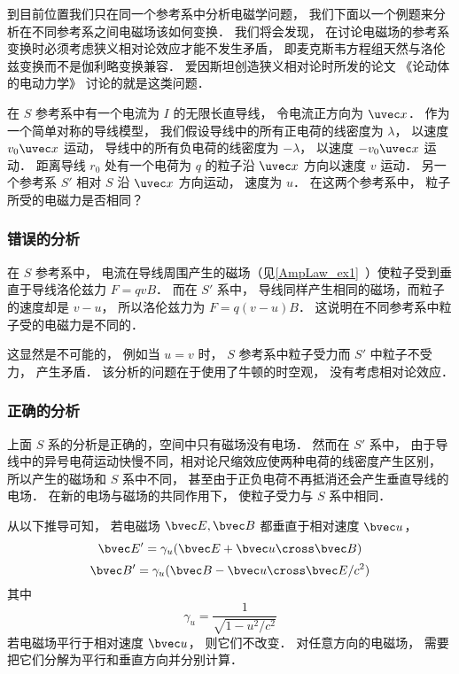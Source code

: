 
\begin{issues}
\issueDraft
\end{issues}


到目前位置我们只在同一个参考系中分析电磁学问题， 我们下面以一个例题来分析在不同参考系之间电磁场该如何变换． 我们将会发现， 在讨论电磁场的参考系变换时必须考虑狭义相对论效应才能不发生矛盾， 即麦克斯韦方程组天然与洛伦兹变换而不是伽利略变换兼容． 爱因斯坦创造狭义相对论时所发的论文 《论动体的电动力学》 讨论的就是这类问题．

在 $S$ 参考系中有一个电流为 $I$ 的无限长直导线， 令电流正方向为 $\uvec x$． 作为一个简单对称的导线模型， 我们假设导线中的所有正电荷的线密度为 $\lambda$， 以速度 $v_0\uvec x$ 运动， 导线中的所有负电荷的线密度为 $-\lambda$，  以速度 $-v_0\uvec x$ 运动． 距离导线 $r_0$ 处有一个电荷为 $q$ 的粒子沿 $\uvec x$ 方向以速度 $v$ 运动． 另一个参考系 $S'$ 相对 $S$ 沿 $\uvec x$ 方向运动， 速度为 $u$． 在这两个参考系中， 粒子所受的电磁力是否相同？

\subsubsection{错误的分析}
在 $S$ 参考系中， 电流在导线周围产生的磁场（见\autoref{AmpLaw_ex1}~）使粒子受到垂直于导线洛伦兹力 $F = qvB$． 而在 $S'$ 系中， 导线同样产生相同的磁场，而粒子的速度却是 $v - u$， 所以洛伦兹力为 $F = q(v-u)B$． 这说明在不同参考系中粒子受的电磁力是不同的．

这显然是不可能的， 例如当 $u = v$ 时， $S$ 参考系中粒子受力而 $S'$ 中粒子不受力， 产生矛盾． 该分析的问题在于使用了牛顿的时空观， 没有考虑相对论效应．

\subsubsection{正确的分析}
上面 $S$ 系的分析是正确的，空间中只有磁场没有电场． 然而在 $S'$ 系中， 由于导线中的异号电荷运动快慢不同，相对论尺缩效应使两种电荷的线密度产生区别， 所以产生的磁场和 $S$ 系中不同， 甚至由于正负电荷不再抵消还会产生垂直导线的电场． 在新的电场与磁场的共同作用下， 使粒子受力与 $S$ 系中相同．

从以下推导可知， 若电磁场 $\bvec E, \bvec B$ 都垂直于相对速度 $\bvec u$，%
\begin{equation}\label{EMRef_eq1}
\bvec E' = \gamma_u (\bvec E + \bvec u \cross \bvec B)
\end{equation}
\begin{equation}\label{EMRef_eq2}
\bvec B' = \gamma_u (\bvec B - \bvec u \cross \bvec E/c^2)
\end{equation}
其中
\begin{equation}
\gamma_u = \frac{1}{\sqrt{1 - u^2/c^2}}
\end{equation}
若电磁场平行于相对速度 $\bvec u$， 则它们不改变． 对任意方向的电磁场， 需要把它们分解为平行和垂直方向并分别计算．

